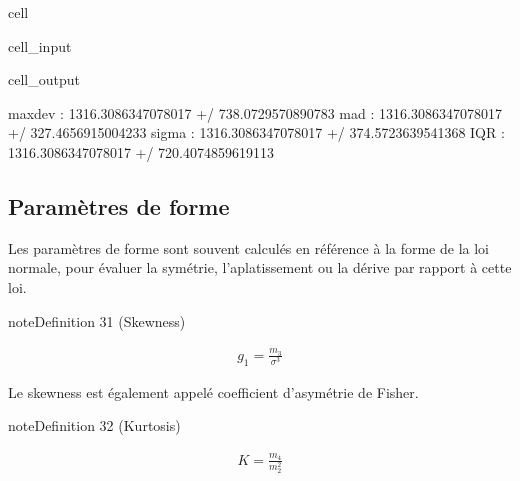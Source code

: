 \documentclass[letterpaper,10pt,french]{sphinxmanual}
\begin{document}
\begin{sphinxuseclass}{cell}
\begin{sphinxuseclass}{cell_input}
\begin{sphinxVerbatim}[commandchars=\\\{\}]
    \PYG{p}{[}\PYG{p}{]}\PYG{p}{[}\PYG{p}{]}
\end{sphinxVerbatim}

\end{sphinxuseclass}
\begin{sphinxuseclass}{cell_output}
\begin{sphinxVerbatim}[commandchars=\\\{\}]
max\PYGZus{}dev  :  1316.3086347078017 +/\PYGZhy{} 738.0729570890783
mad  :  1316.3086347078017 +/\PYGZhy{} 327.4656915004233
sigma  :  1316.3086347078017 +/\PYGZhy{} 374.5723639541368
IQR  :  1316.3086347078017 +/\PYGZhy{} 720.4074859619113
\end{sphinxVerbatim}

\noindent{}

\end{sphinxuseclass}
\end{sphinxuseclass}

\subsection{Paramètres de forme}
\label{\detokenize{statsdescriptives:parametres-de-forme}}
\sphinxAtStartPar
Les paramètres de forme sont souvent calculés en référence à la forme de la loi normale, pour évaluer la symétrie, l’aplatissement ou la dérive par rapport à cette loi.
\label{statsdescriptives:definition-15}
\begin{sphinxadmonition}{note}{Definition 31 (Skewness)}


\begin{equation*}
\begin{split}g_1 = \frac{m_3}{\sigma^3}\end{split}
\end{equation*}\end{sphinxadmonition}

\sphinxAtStartPar
Le skewness est également appelé coefficient d’asymétrie de Fisher.
\label{statsdescriptives:definition-16}
\begin{sphinxadmonition}{note}{Definition 32 (Kurtosis)}


\begin{equation*}
\begin{split}K=\frac{m_4}{m_2^2}\end{split}
\end{equation*}\end{sphinxadmonition}
\end{document}

